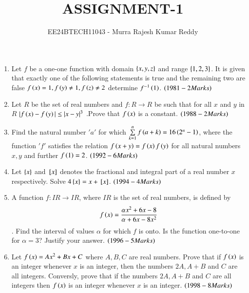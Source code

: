 \documentclass[journal,12pt,onecolumn,article]{IEEEtran}
\theoremstyle{remark}
\begin{document}

\vspace{3cm}
\title{ASSIGNMENT-1}
\author{EE24BTECH11043 - Murra Rajesh Kumar Reddy}
\maketitle
\bigskip
\begin{enumerate}
	\item Let $f$ be a one-one function with domain $\left\{x,y,z\right\}$ and range $\left\{1,2,3\right\}$. It is given that exactly one of the following statements is true and the remaining two are false ${f\left(x\right)=1},{f\left(y\right)\neq1},{f\left(z\right)\neq2}$ determine $f^{-1}\left(1\right)$. \hfill{$\left(1981 - 2 Marks\right)$}
	\item Let $R$ be the set of real numbers and $f:R \to R$ be such that for all $x$ and $y$ in $R$ ${|f\left(x\right)-f\left(y\right)| \le |x-y|^3}$ .Prove that $f\left(x\right)$ is a constant. \hfill{$\left(1988 - 2 Marks\right)$}
	\item Find the natural number $'a'$ for which ${\sum\limits_{k=1}^nf\left(a+k\right)=16\left(2^n -1\right)}$, where the function $'f'$ satisfies the relation ${f\left(x+y\right)=f\left(x\right)f\left(y\right)}$ for all natural numbers $x, y$ and further ${f\left(1\right)=2}$. \hfill${\left(1992- 6 Marks\right)}$
	\item Let $\left\{x\right\}$ and ${}\left[x\right]$ denotes the fractional and integral part of a real number $x$ respectively. Solve ${4\left\{x\right\}=x+{}\left[x\right]}$. \hfill$\left(1994- 4 Marks\right)$
	\item A function $f:IR\to IR$, where $IR$ is the set of real numbers, is defined by
		\begin{align}
			{f\ensuremath{\left(x\right)}=\frac{\alpha x^2 +6x -8}{\alpha +6x-8x^2}}
		\end{align}
		. Find the interval of values $\alpha$ for which $f$ is onto. Is the function one-to-one for $\alpha=3$? Justify your answer. \hfill${\left(1996- 5 Marks\right)}$
	\item Let ${f\left(x\right)=Ax^2+Bx+C}$ where $A,B,C$ are real numbers. Prove that if $f\left(x\right)$ is an integer whenever $x$ is an integer, then the numbers $2A, A+B$ and $C$ are all integers. Conversly, prove that if the numbers $2A, A+B$ and $C$ are all integers then $f\left(x\right)$ is an integer whenever $x$ is an integer. \hfill${\left(1998- 8 Marks\right)}$ 
\end{enumerate}
\end{document}
